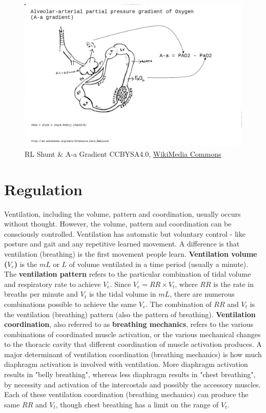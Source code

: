 \begin{figure}[!h]
    \centering
    \includegraphics[width=1.0 \linewidth]{./figure/ventilation/aagradient.jpg}
    \caption{RL Shunt \& A-a Gradient \footnotesize{CCBYSA4.0, \href{https://commons.wikimedia.org/wiki/File:Intensivecaremedicine_aagradient.jpg}{WikiMedia Commons}}}
    \label{fig:aagradient}
\end{figure}


\section{Regulation}

Ventilation, including the volume, pattern and coordination, usually occurs without thought. However, the volume, pattern and coordination can be consciously controlled. Ventilation has automatic but voluntary control - like posture and gait and any repetitive learned movement. A difference is that ventilation (breathing) is the first movement people learn. \textbf{Ventilation volume ($V_e$)} is the $mL$ or $L$ of volume ventilated in a time period (usually a minute). The \textbf{ventilation pattern} refers to the particular combination of tidal volume and respiratory rate to achieve $V_e$. Since $V_e = RR \times V_t$, where $RR$ is the rate in breaths per minute and $V_t$ is the tidal volume in $mL$, there are numerous combinations possible to achieve the same $V_e$. The combination of $RR$ and $V_t$ is the ventilation (breathing) pattern (also the pattern of breathing). \textbf{Ventilation coordination}, also referred to as \textbf{breathing mechanics}, refers to the various combinations of coordinated muscle activation, or the various mechanical changes to the thoracic cavity that different coordination of muscle activation produces. A major determinant of ventilation coordination (breathing mechanics) is how much diaphragm activation is involved with ventilation. More diaphragm activation results in "belly breathing", whereas less diaphragm results in "chest breathing", by necessity and activation of the intercostals and possibly the accessory muscles. Each of these ventilation coordination (breathing mechanics) can produce the same $RR$ and $V_t$, though chest breathing has a limit on the range of $V_t$.
